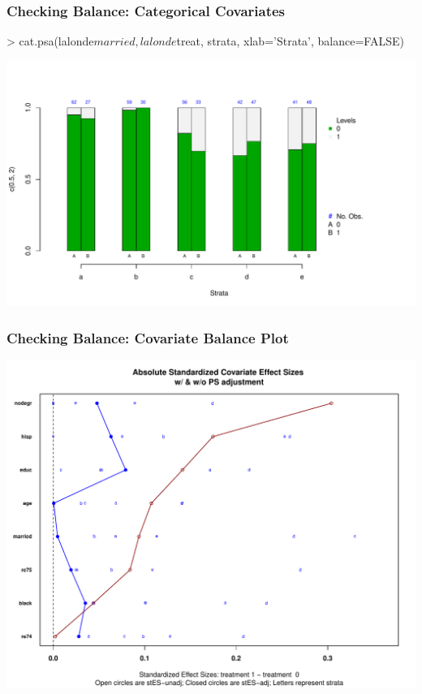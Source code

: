 \documentclass[10pt,slidestop,mathserif,c]{beamer}
\begin{document}
\begin{frame}
    \frametitle{Checking Balance: Categorical Covariates}
\begin{Schunk}
\begin{Sinput}
> cat.psa(lalonde$married, lalonde$treat, strata, xlab='Strata', 
   balance=FALSE)
\end{Sinput}
\end{Schunk}
    \begin{center}
        \includegraphics{figures/Slides-catpsa}
    \end{center}
\end{frame}

\begin{frame}
    \frametitle{Checking Balance: Covariate Balance Plot}
    \begin{center}
        \includegraphics{figures/Slides-cvbalpsa}
    \end{center}
\end{frame}
\end{document}
